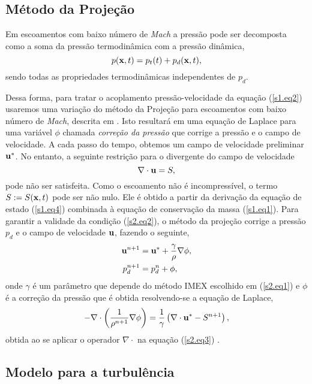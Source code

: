 \documentclass[12pt, brazil]{article}
\begin{document}
\subsection{Método da Projeção}

Em escoamentos com baixo número de {\it Mach} \cite{BEL05,MAD85,PEM98} a pressão pode ser decomposta como a soma da pressão termodinâmica com a pressão dinâmica,
\begin{equation}\label{s1.eq5}
p({\bf x},t) = p_t(t) + p_d({\bf x},t),
\end{equation}
sendo todas as propriedades termodinâmicas independentes de $p_d$.

Dessa forma, para tratar o acoplamento pressão-velocidade da equação (\ref{s1.eq2}) usaremos uma variação do método da Projeção \cite{CHO68, TEM01} para escoamentos com baixo número de {\it Mach}, descrita em \cite{BEL05,CAL12,PEM98}. Isto resultará em uma equação de Laplace para uma variável $\phi$ chamada {\em correção da pressão} que corrige a pressão e o campo de velocidade. A cada passo do tempo, obtemos um campo de velocidade preliminar ${\bf u}^{*}$. No entanto, a seguinte restrição para o divergente do campo de velocidade
\begin{equation}\label{s2.eq2}
  \nabla\cdot{\bf u} = S,
\end{equation}
pode não ser satisfeita. Como o escoamento não é incompressível, o termo $S:=S({\bf x},t)$ pode ser não nulo. Ele é obtido a partir da derivação da equação de estado (\ref{s1.eq4}) combinada à equação de conservação da massa (\ref{s1.eq1}). Para garantir a validade da condição (\ref{s2.eq2}), o método da projeção corrige a pressão $p_d$ e o campo de velocidade ${\bf u}$, fazendo o seguinte,
\begin{align}\label{s2.eq3}
  {\bf u}^{n+1} & = {\bf u^*} + \dfrac{\gamma}{\rho}\nabla \phi,\\
  \label{s2.eq3a}
    p_d^{n+1} & = p_d^n + \phi,
\end{align}
onde $\gamma$ é um parâmetro que depende do método IMEX escolhido em (\ref{s2.eq1}) e $\phi$ é a correção da pressão que é obtida resolvendo-se a equação de Laplace,
\begin{equation}\label{s2.eq4}
 - \nabla \cdot\left(\dfrac{1}{\rho^{n+1}}\nabla \phi\right) = \dfrac{1}{\gamma}\left(\nabla\cdot{\bf u^*} - S^{n+1}\right),
\end{equation}
obtida ao se aplicar o operador $\nabla\cdot$ na equação (\ref{s2.eq3}) \cite{BEL05,CAL12,PEM98}.

\subsection{Modelo para a turbulência}
\end{document}
